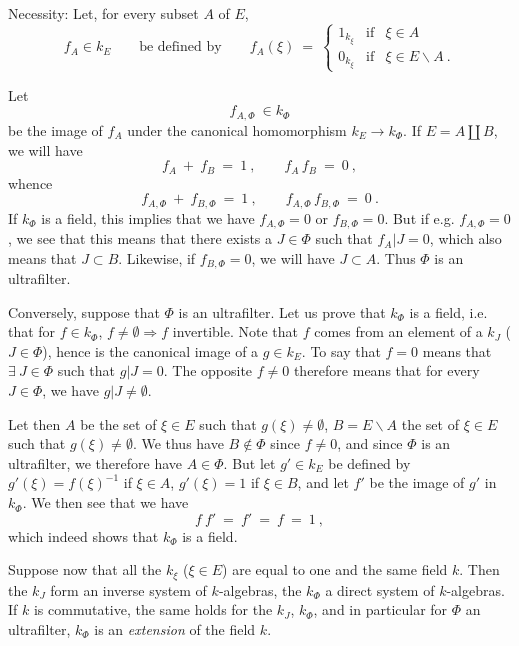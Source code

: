 \noindent Necessity: Let, for every subset $A$ of $E$,
\[
f_A\in k_E \qquad \text{be defined by} \qquad f_A(\xi) \ = \ \left\{
\begin{array}{lll}
1_{k_\xi} & \text{if} & \xi\in A\\[1ex]
0_{k_\xi} & \text{if} & \xi\in E\backslash A \ .
\end{array}\right.
\]

\noindent Let
\[
f_{A,\Phi} \ \in k_\Phi
\]
be the image of $f_A$ under the canonical homomorphism $k_E\longrightarrow k_\Phi$. If $E=A\amalg B$, we will have
\[
f_A \ + \ f_B \ = \ 1 \ , \qquad f_A\, f_B \ = \ 0 \ ,
\]
whence
\[
f_{A,\Phi} \ + \ f_{B,\Phi} \ = \ 1 \ , \qquad f_{A,\Phi}\, f_{B,\Phi} \ = \ 0 \ .
\]
If $k_\Phi$ is a field, this implies that we have $f_{A,\Phi}=0$ or $f_{B,\Phi}=0$. But if e.g. $f_{A,\Phi}=0$, we see that this means that there exists a $J\in\Phi$ such that $f_A|J=0$, which also means that $J\subset B$. Likewise, if $f_{B,\Phi}=0$, we will have $J\subset A$. Thus $\Phi$ is an ultrafilter.

\noindent Conversely, suppose that $\Phi$ is an ultrafilter. Let us prove that $k_\Phi$ is a field, i.e. that for $f\in k_\Phi$, $f\neq\emptyset\Longrightarrow f$ invertible. Note that $f$ comes from an element of a $k_J$ ($J\in\Phi$), hence is the canonical image of a $g\in k_E$. To say that $f=0$ means that $\exists\ J\in\Phi$ such that $g|J=0$. The opposite $f\neq0$ therefore means that for every $J\in\Phi$, we have $g|J\neq\emptyset$.

\noindent Let then $A$ be the set of $\xi\in E$ such that $g(\xi)\neq\emptyset$, $B=E\backslash A$ the set of $\xi\in E$ such that $g(\xi)\neq\emptyset$. We thus have $B\notin\Phi$ since $f\neq0$, and since $\Phi$ is an ultrafilter, we therefore have $A\in\Phi$. But let $g'\in k_E$ be defined by $g'(\xi)=f(\xi)^{-1}$ if $\xi\in A$, $g'(\xi)=1$ if $\xi\in B$, and let $f'$ be the image of $g'$ in $k_\Phi$. We then see that we have %
\[
f\ f' \ = \ f' \ = \ f \ = \ 1 \ ,
\]
which indeed shows that $k_\Phi$ is a field.

\noindent Suppose now that all the $k_\xi$ ($\xi\in E$) are equal to one and the same field $k$. Then the $k_J$ form an inverse system of $k$-algebras, the $k_\Phi$ a direct system of $k$-algebras. If $k$ is commutative, the same holds for the $k_J$, $k_\Phi$, and in particular for $\Phi$ an ultrafilter, $k_\Phi$ is an \textit{extension} of the field $k$.

